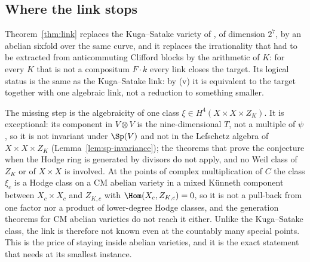 \subsection{Where the link stops}\label{ssec:f2stop2}

Theorem~\ref{thm:link} replaces the Kuga--Satake variety of \cite[Thm.~21.4]{BMB26}, of dimension $2^{7}$, by an abelian sixfold over the same curve, and it replaces the irrationality that had to be extracted from anticommuting Clifford blocks by the arithmetic of $K$: for every $K$ that is not a compositum $F\cdot k$ every link closes the target. Its logical status is the same as the Kuga--Satake link: by (v) it is equivalent to the target together with one algebraic link, not a reduction to something smaller.

The missing step is the algebraicity of one class $\xi\in H^{4}(X\times X\times Z_{K})$. It is exceptional: its component in $V\otimes V$ is the nine-dimensional $T$, not a multiple of $\psi$, so it is not invariant under $\Sp(V)$ and not in the Lefschetz algebra of $X\times X\times Z_{K}$ (Lemma~\ref{lem:sp-invariance}); the theorems that prove the conjecture when the Hodge ring is generated by divisors do not apply, and no Weil class of $Z_{K}$ or of $X\times X$ is involved. At the points of complex multiplication of $C$ the class $\xi_{c}$ is a Hodge class on a CM abelian variety in a mixed K\"unneth component between $X_{c}\times X_{c}$ and $Z_{K,c}$ with $\Hom(X_{c},Z_{K,c})=0$, so it is not a pull-back from one factor nor a product of lower-degree Hodge classes, and the generation theorems for CM abelian varieties do not reach it either. Unlike the Kuga--Satake class, the link is therefore not known even at the countably many special points. This is the price of staying inside abelian varieties, and it is the exact statement that \Fii{} needs at its smallest instance.
